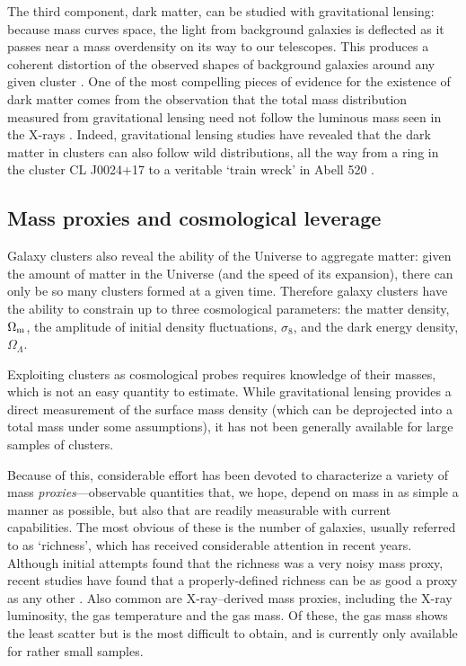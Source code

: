 The third component, dark matter, can be studied with gravitational lensing: because mass curves space, the light from background galaxies is deflected as it passes near a mass overdensity on its way to our telescopes. This produces a coherent distortion of the observed shapes of background galaxies around any given cluster \citep{?}. One of the most compelling pieces of evidence for the existence of dark matter comes from the observation that the total mass distribution measured from gravitational lensing need not follow the luminous mass seen in the X-rays \citep[e.g.,][]{clowe06,dawson12}. Indeed, gravitational lensing studies have revealed that the dark matter in clusters can also follow wild distributions, all the way from a ring in the cluster CL J0024+17 \citep{jee07} to a veritable `train wreck' in Abell 520 \citep{jee14}.



\subsection{Mass proxies and cosmological leverage}

Galaxy clusters also reveal the ability of the Universe to aggregate matter: given the amount of matter in the Universe (and the speed of its expansion), there can only be so many clusters formed at a given time. Therefore galaxy clusters have the ability to constrain up to three cosmological parameters: the matter density, $\Omega_{\rm m}$, the amplitude of initial density fluctuations, $\sigma_8$, and the dark energy density, $\Omega_\Lambda$.

Exploiting clusters as cosmological probes requires knowledge of their masses, which is not an easy quantity to estimate. While gravitational lensing provides a direct measurement of the surface mass density (which can be deprojected into a total mass under some assumptions), it has not been generally available for large samples of clusters.

Because of this, considerable effort has been devoted to characterize a variety of mass \emph{proxies}---observable quantities that, we hope, depend on mass in as simple a manner as possible, but also that are readily measurable with current capabilities. The most obvious of these is the number of galaxies, usually referred to as `richness', which has received considerable attention in recent years. Although initial attempts found that the richness was a very noisy mass proxy, recent studies have found that a properly-defined richness can be as good a proxy as any other \citep{rykoff12,andreon15}. Also common are X-ray--derived mass proxies, including the X-ray luminosity, the gas temperature and the gas mass. Of these, the gas mass shows the least scatter \citep{mahdavi13} but is the most difficult to obtain, and is currently only available for rather small samples.

